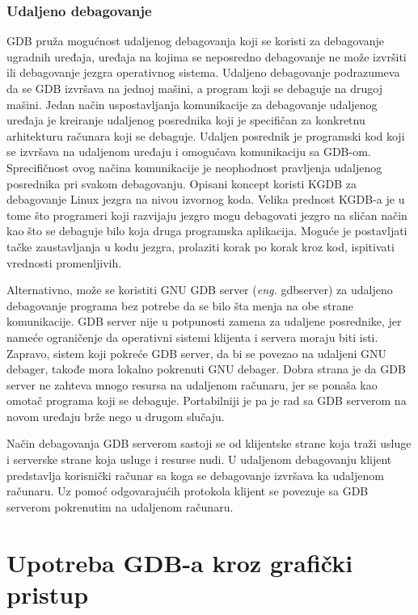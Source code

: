 \documentclass[a4paper]{article}
\begin{document}
\subsubsection{Udaljeno debagovanje}
\label{subsec:gdb_udaljeno}

GDB pruža mogućnost udaljenog debagovanja koji se koristi za debagovanje ugradnih uređaja, 
uređaja na kojima se neposredno debagovanje ne može izvršiti ili debagovanje jezgra operativnog sistema. 
Udaljeno debagovanje podrazumeva da se GDB izvršava na jednoj mašini, a program koji se debaguje na 
drugoj mašini.
Jedan način uspostavljanja komunikacije za debagovanje udaljenog uređaja je kreiranje udaljenog posrednika koji je specifičan za konkretnu arhitekturu računara koji se debaguje. Udaljen posrednik je programski kod koji se izvršava na udaljenom uređaju i omogućava komunikaciju sa GDB-om. Sprecifičnost ovog načina komunikacije je neophodnost pravljenja udaljenog posrednika pri svakom debagovanju. 
Opisani koncept koristi KGDB za debagovanje Linux jezgra na nivou izvornog koda. Velika prednost KGDB-a 
je u tome što programeri koji razvijaju jezgro mogu debagovati jezgro na sličan način kao što se 
debaguje bilo koja druga programska aplikacija. Moguće je postavljati tačke zaustavljanja u kodu jezgra, 
prolaziti korak po korak kroz kod, ispitivati vrednosti promenljivih.\cite{kgd}

Alternativno, može se koristiti GNU GDB server (\textit{eng.} gdbserver) za udaljeno debagovanje 
programa bez potrebe da se bilo šta menja na obe strane komunikacije. GDB server nije u potpunosti 
zamena za udaljene posrednike, jer nameće ograničenje da operativni sistemi klijenta i servera 
moraju biti isti. Zapravo, sistem koji pokreće GDB server, da bi se povezao na udaljeni GNU debager, 
takođe mora lokalno pokrenuti GNU debager. Dobra strana je da GDB server ne zahteva mnogo 
resursa na udaljenom računaru, jer se ponaša kao omotač programa koji se debaguje. 
Portabilniji je pa je rad sa GDB serverom na novom uređaju brže nego u drugom slučaju. 

Način debagovanja GDB serverom sastoji se od klijentske strane koja traži usluge i serverske strane 
koja usluge i resurse nudi. U udaljenom debagovanju klijent predstavlja korisnički računar sa koga se 
debagovanje izvršava ka udaljenom računaru. Uz pomoć odgovarajućih protokola klijent se povezuje 
sa GDB serverom pokrenutim na udaljenom računaru\cite{master_rad}. 


\section{Upotreba GDB-a kroz grafički pristup}
\label{subsec:gui}
\end{document}
